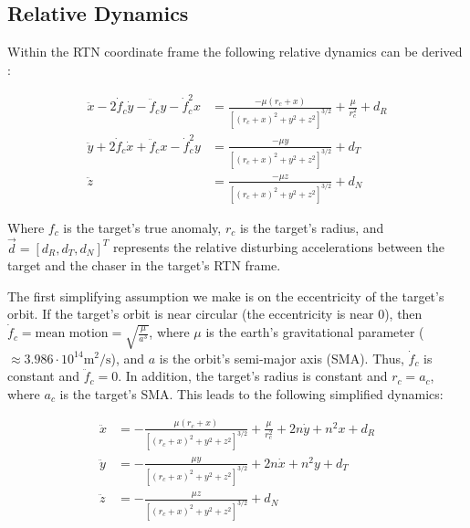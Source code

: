 \documentclass[conference]{IEEEtran}
\begin{document}

\subsection{Relative Dynamics}

Within the RTN coordinate frame the following relative dynamics can be derived
\cite{sullivan_comprehensive_2017}:

\begin{equation}
    \label{eq:full-dynamics}
    \begin{split}
        \ddot{x} - 2\dot{f}_c\dot{y} - \ddot{f}_c y - \dot{f}_c^2 x & =
            \frac{-\mu(r_c + x)}{\left[ (r_c+x)^2 + y^2 + z^2\right]^{3/2}} +
            \frac{\mu}{r_c^2} + d_R \\
        \ddot{y} + 2\dot{f}_c\dot{x} + \ddot{f}_c x - \dot{f}_c^2 y & =
            \frac{-\mu y}{\left[ (r_c+x)^2 + y^2 + z^2\right]^{3/2}} + d_T \\
        \ddot{z} & = \frac{-\mu z}{\left[ (r_c+x)^2 + y^2 + z^2\right]^{3/2}} +
            d_N
    \end{split}
\end{equation}

Where $f_c$ is the target's true anomaly, $r_c$ is the target's radius, and
$\vec{d} = [d_R, d_T, d_N]^T$ represents the relative disturbing accelerations
between the target and the chaser in the target's RTN frame.

The first simplifying assumption we make is on the eccentricity of the target's
orbit. If the target's orbit is near circular (the eccentricity is near 0),
then $\dot{f}_c = \text{mean motion} = \sqrt{\frac{\mu}{a^3}}$, where $\mu$ is
the earth's gravitational parameter ($\approx 3.986\cdot10^{14} \text{
m}^2/\text{s}$), and $a$ is the orbit's semi-major axis (SMA). Thus,
$\dot{f}_c$ is constant and $\ddot{f}_c = 0$. In addition, the target's radius
is constant and $r_c = a_c$, where $a_c$ is the target's SMA. This leads to the following
simplified dynamics:

\begin{equation}
    \label{eq:circular-dynamics}
    \begin{split}
        \ddot{x} & =
            -\frac{\mu(r_c + x)}{\left[ (r_c+x)^2 + y^2 + z^2\right]^{3/2}} +
            \frac{\mu}{r_c^2} + 2n\dot{y} + n^2 x + d_R \\
        \ddot{y} & = -\frac{\mu y}{\left[ (r_c+x)^2 + y^2 + z^2\right]^{3/2}} +
            2n\dot{x} + n^2 y + d_T \\
        \ddot{z} & = -\frac{\mu z}{\left[ (r_c+x)^2 + y^2 + z^2\right]^{3/2}} +
            d_N
    \end{split}
\end{equation}
\end{document}
